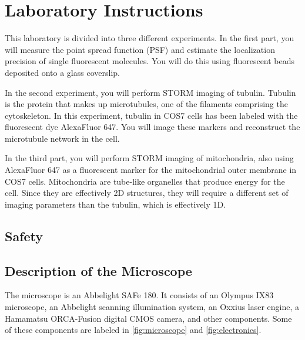 \documentclass[10pt,a4paper,oneside]{book}
\begin{document}
\chapter{Laboratory Instructions}

This laboratory is divided into three different experiments. In the first part, you will measure the point spread function (PSF) and estimate the localization precision of single fluorescent molecules. You will do this using fluorescent beads deposited onto a glass coverslip.

In the second experiment, you will perform STORM imaging of tubulin. Tubulin is the protein that makes up microtubules, one of the filaments comprising the cytoskeleton. In this experiment, tubulin in COS7 cells has been labeled with the fluorescent dye AlexaFluor 647. You will image these markers and reconstruct the microtubule network in the cell.

In the third part, you will perform STORM imaging of mitochondria, also using AlexaFluor 647 as a fluorescent marker for the mitochondrial outer membrane in COS7 cells. Mitochondria are tube-like organelles that produce energy for the cell. Since they are effectively 2D structures, they will require a different set of imaging parameters than the tubulin, which is effectively 1D.

\section{Safety}

\newline

\noindent{}\newline

\section{Description of the Microscope}

The microscope is an Abbelight SAFe 180. It consists of an Olympus IX83 microscope, an Abbelight scanning illumination system, an Oxxius laser engine, a Hamamatsu ORCA-Fusion digital CMOS camera, and other components. Some of these components are labeled in \autoref{fig:microscope} and \autoref{fig:electronics}.
\end{document}
